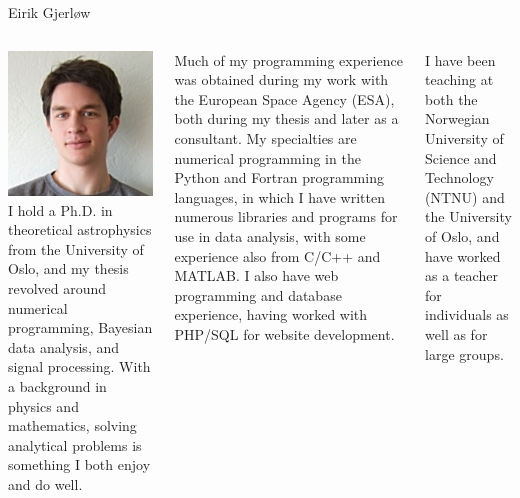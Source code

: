 \documentclass[norsk]{beamer}
\begin{document}
\begin{frame}{Eirik Gjerløw}
  \begin{columns}
  \includegraphics[width=\textwidth]{../people/eirik.png}
     \tiny
I hold a Ph.D. in theoretical astrophysics from the University of Oslo, and my thesis revolved around numerical programming,  Bayesian data analysis, and signal processing. With a background in physics and mathematics, solving analytical problems is something I both enjoy and do well.

Much of my programming experience was obtained during my work with the European Space Agency (ESA), both during my thesis and later as a consultant. My specialties are numerical programming in the Python and Fortran programming languages, in which I have written
numerous libraries and programs for use in data analysis, with some experience also from C/C++ and MATLAB. I also have web programming and database experience, having worked with PHP/SQL for website development.

I have been teaching at both the Norwegian University of Science and Technology (NTNU) and the University of Oslo,  and have worked as a teacher for individuals as well as for large groups.
  \end{columns}
\end{frame}
\end{document}
